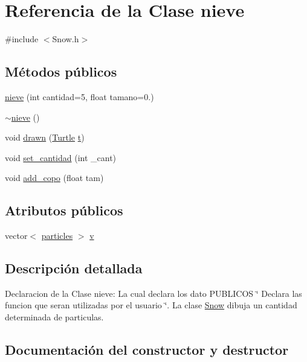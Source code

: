 \hypertarget{classnieve}{}\section{Referencia de la Clase nieve}
\label{classnieve}


{\ttfamily \#include $<$Snow.\+h$>$}

\subsection*{Métodos públicos}
\begin{DoxyCompactItemize}
\item 
\mbox{\hyperlink{classnieve_ab19d501ce4d89b2c2b2e2fc6595d72f0}{nieve}} (int cantidad=5, float tamano=0.)
\item 
\mbox{\hyperlink{classnieve_a554baea3727dc5650c5e8cec2f765e24}{$\sim$nieve}} ()
\item 
void \mbox{\hyperlink{classnieve_a11c4d67704bad84f82f3f574d98958ef}{drawn}} (\mbox{\hyperlink{class_turtle}{Turtle}} \mbox{\hyperlink{_abstract_8cpp_a87833ae07d42f160626b6355cd9f8cf0}{t}})
\item 
void \mbox{\hyperlink{classnieve_a447ff743623611b1dd3bfe617e40d52e}{set\+\_\+cantidad}} (int \+\_\+cant)
\item 
void \mbox{\hyperlink{classnieve_ab9448be3dcc8882de5153a4a2ee04aa1}{add\+\_\+copo}} (float tam)
\end{DoxyCompactItemize}
\subsection*{Atributos públicos}
\begin{DoxyCompactItemize}
\item 
vector$<$ \mbox{\hyperlink{classparticles}{particles}} $>$ \mbox{\hyperlink{classnieve_a53571bcacc0b6d8ba54823c9f03df3e9}{v}}
\end{DoxyCompactItemize}


\subsection{Descripción detallada}
Declaracion de la Clase nieve\+: La cual declara los dato P\+U\+B\+L\+I\+C\+OS \char`\"{} Declara las funcion que seran utilizadas por el usuario \char`\"{}. La clase \mbox{\hyperlink{class_snow}{Snow}} dibuja un cantidad determinada de particulas. 

\subsection{Documentación del constructor y destructor}
\mbox{\label{classnieve_ab19d501ce4d89b2c2b2e2fc6595d72f0}} 
